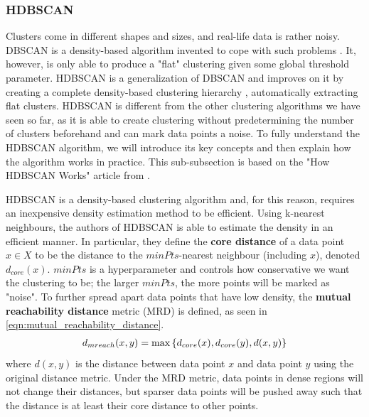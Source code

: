\subsubsection{HDBSCAN}
\label{sec:hdbscan-clustering}
Clusters come in different shapes and sizes, and real-life data is rather noisy. DBSCAN is a density-based algorithm invented to cope with such problems \cite{Ester1996}. It, however, is only able to produce a "flat" clustering given some global threshold parameter. HDBSCAN is a generalization of DBSCAN and improves on it by creating a complete density-based clustering hierarchy \cite{Campello2013}, automatically extracting flat clusters. HDBSCAN is different from the other clustering algorithms we have seen so far, as it is able to create clustering without predetermining the number of clusters beforehand and can mark data points a noise. To fully understand the HDBSCAN algorithm, we will introduce its key concepts and then explain how the algorithm works in practice. This sub-subsection is based on the "How HDBSCAN Works" article from \cite{how-hdbscan-works-2016}.

HDBSCAN is a density-based clustering algorithm and, for this reason, requires an inexpensive density estimation method to be efficient. Using k-nearest neighbours, the authors of HDBSCAN is able to estimate the density in an efficient manner. In particular, they define the \textbf{core distance} of a data point $x \in X$ to be the distance to the $\textit{minPts}$-nearest neighbour (including $x$), denoted $d_{core}(x)$. $\textit{minPts}$ is a hyperparameter and controls how conservative we want the clustering to be; the larger $\textit{minPts}$, the more points will be marked as "noise". To further spread apart data points that have low density, the \textbf{mutual reachability distance} metric (MRD) is defined, as seen in \cref{eqn:mutual_reachability_distance}.
\begin{align}
    d_{mreach}(x, y) = \max \left\{ d_{core}(x), d_{core}(y), d(x, y) \right\}
    \label{eqn:mutual_reachability_distance}
\end{align}
where $d(x, y)$ is the distance between data point $x$ and data point $y$ using the original distance metric. Under the MRD metric, data points in dense regions will not change their distances, but sparser data points will be pushed away such that the distance is at least their core distance to other points.

